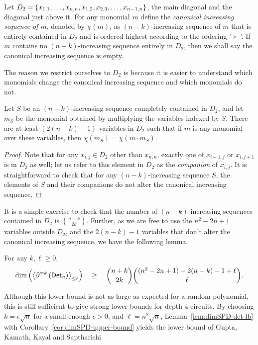 \begin{definition}
Let $D_2 = \left\{x_{1,1},\dots, x_{n,n}, x_{1,2},x_{2,3}, \dots, x_{n-1,n}\right\}$, the main diagonal and the diagonal just above it. For any monomial $m$ define the \emph{canonical increasing sequence of $m$}, denoted by $\chi(m)$, as $(n-k)$-increasing sequence of $m$ that is entirely contained in $D_2$ and is ordered highest according to the ordering '$\succ$'. If $m$ contains no $(n-k)$-increasing sequence entirely in $D_2$, then we shall say the canonical increasing sequence is empty. 
\end{definition}

The reason we restrict ourselves to $D_2$ is because it is easier to understand which monomials change the canonical increasing sequence and which monomials do not. 

\begin{lemma}\label{lem:forbidden-variables}
Let $S$ be an $(n-k)$-increasing sequence completely contained in $D_2$, and let $m_S$ be the monomial obtained by multiplying the variables indexed by $S$. There are at least $(2(n-k)-1)$ variables in $D_2$ such that if $m$ is any monomial over these variables, then $\chi(m_S) = \chi(m\cdot m_S)$. 
\end{lemma}
\begin{proof}
Note that for any $x_{i,j} \in D_2$ other than $x_{n,n}$, exactly one of $x_{i+1,j}$ or $x_{i,j+1}$ is in $D_2$ as well; let us refer to this element in $D_2$ as the \emph{companion} of $x_{i,j}$.  It is straightforward to check that for any $(n-k)$-increasing sequence $S$, the elements of $S$ and their companions do not alter the canonical increasing sequence. 
\end{proof}

It is a simple exercise to check that the number of $(n-k)$-increasing sequences contained in $D_2$ is $\binom{n+k}{2k}$. Further, as we are free to use the $n^2 - 2n + 1$ variables outside $D_2$, and the $2(n-k) -1$ variables that don't alter the canonical increasing sequence, we have the following lemma. 

\begin{lemma}\label{lem:dimSPD-det-lb}
For any $k,\ell \geq 0$, 
$$
\dim\left(\left\langle\partial^{=k}\left(\mathsf{Det}_n\right)\right\rangle_{\leq \ell}\right) \quad \geq \quad \binom{n+k}{2k}\binom{(n^2 - 2n + 1) + 2(n-k) -1 + \ell}{\ell}.
$$
\end{lemma}

Although this lower bound is not as large as expected for a random polynomial, this is still sufficient to give strong lower bounds for depth-$4$ circuits. By choosing $k = \epsilon \sqrt{n}$ for a small enough $\epsilon > 0$, and $\ell = n^2 \sqrt{n}$, Lemma~\ref{lem:dimSPD-det-lb} with Corollary~\ref{cor:dimSPD-upper-bound} yields the lower bound of Gupta, Kamath, Kayal and Saptharishi \cite{gkks13}

